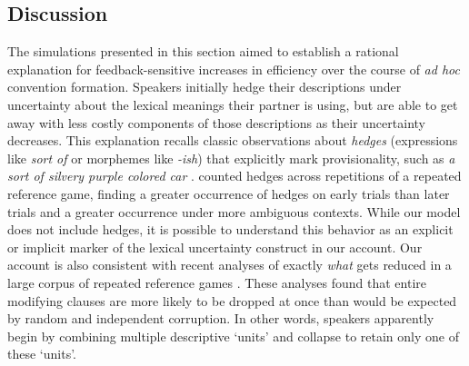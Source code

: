 \subsection{Discussion}

The simulations presented in this section aimed to establish a rational explanation for feedback-sensitive increases in efficiency over the course of \emph{ad hoc} convention formation.
Speakers initially hedge their descriptions under uncertainty about the lexical meanings their partner is using, but are able to get away with less costly components of those descriptions as their uncertainty decreases.
This explanation recalls classic observations about \emph{hedges} (expressions like \emph{sort of} or morphemes like \emph{-ish}) that explicitly mark provisionality, such as \emph{a sort of silvery purple colored car} \cite{lakoff1975hedges,Fraser10_Hedging,MedlockBriscoe07_HedgeClassification}.
 counted hedges across repetitions of a repeated reference game, finding a greater occurrence of hedges on early trials than later trials and a greater occurrence under more ambiguous contexts.
While our model does not include hedges, it is possible to understand this behavior as an explicit or implicit marker of the lexical uncertainty construct in our account.
Our account is also consistent with recent analyses of exactly \emph{what} gets reduced in a large corpus of repeated reference games \cite{hawkins2020characterizing}.
These analyses found that entire modifying clauses are more likely to be dropped at once than would be expected by random and independent corruption.
%
%
In other words, speakers apparently begin by combining multiple descriptive `units' and collapse to retain only one of these `units'.


